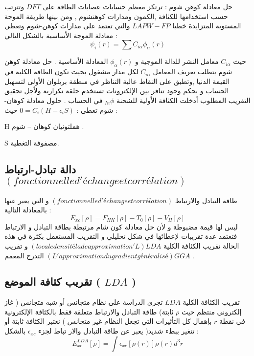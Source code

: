 حل معادلة كوهن شوم : ترتكز معظم حسابات عصابات الطاقة على $ DFT $ وتترتب حسب استخدامها  للكثافة ,الكمون ومدارات كوهنشوم , ومن بينها طريقة الموجة المستوية المتزايدة خطيا $ LAPW-FP $ والتي تعتمد على  مدارات كوهن-شوم وتعطي معادلة الموجة الأساسية بالشكل التالي :
\begin{equation}\label{key}
	\psi_{i} (r) = \sum C_{i\alpha} \phi_{\alpha} (r)
\end{equation}

حيث  $ C_{i\alpha} $ معامل النشر للدالة الموجية و $ \phi_{\alpha} (r) $ المعادلة الأساسية .
حل معادلة كوهن شوم يتطلب تعريف المعامل $ C_{i\alpha} $  لكل مدار مشغول بحيث تكون الطاقة الكلية في القيمة الدنيا ,وتطبق على النقاط عالية التناظر في منطقة  بريلوان الأولى لتسهيل الحساب و بحكم وجود تنافر بين الإلكترونات تستخدم حلقة  تكرارية ولأجل تحقيق التقريب المطلوب أدخلت الكثافة الأولية للشحنة  $ _{In}\phi  $ في الحساب .  
حلول معادلة كوهان-شوم تعطى : $ 0 = C_{i} ( H - \epsilon_{i} S ) $
حيث :
\begin{list}{}{}
	\item 
	H هملتونيان كوهان – شوم .
	\item
	S مصفوفة التغطية.
\end{list}

\subsection{ دالة تبادل-ارتباط $ ( fonctionnelle d'échange et corrélation ) $  }

طاقة التبادل والارتباط $ ( fonctionnelle d'échange et corrélation ) $ و التي يعبر عنها بالمعادلة التالية :
\begin{equation}\label{}
	E_{xc} \left[\rho\right] = F_{HK} \left[\rho\right] - T_{0} \left[\rho\right] - V_{H} \left[\rho\right]	
\end{equation}
ليس لها قيمة مضبوطة و لأن حل معادلة كون شام مرتبطة بطاقة التبادل و الارتباط فتعتمد عدة  تقريبات لإعطائها في شكل تحليلي و التقريب المستعمل بكثرة  في هذه الحالة تقريب الكثافة الكلية $ ( locale densité la de approximation'L ) LDA  $ و تقريب التدرج  المعمم $ ( L'approximation du gradient généralisé ) GGA $ .

\subsection{ تقريب كثافة الموضع ( $ LDA $ ) }
تقريب الكثافة الكلية $ LDA  $ تجرى الدراسة على نظام متجانس أو شبه متجانس ( غاز إلكتروني منتظم  حيث $ \rho $  ثابتة) طاقة التبادل والارتباط متعلقة فقط بالكثافة الإلكترونية في نقطة $ r $ بإهمال كل التأثيرات التي تجعل النظام غير متجانس ) نعتبر الكثافة ثابتة أو تتغير ببطء شديد( يعبر عن طاقة التبادل والار تباط لجزء $ \epsilon_{xc} $ بالشكل :
\begin{equation}\label{}
	E_{xc}^{LDA} \left[\rho\right] =  \int  \epsilon_{xc} \left[\rho (r) \right] \rho (r) d^{3}r
\end{equation}

